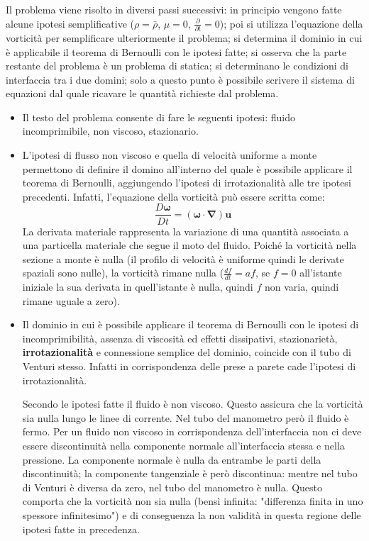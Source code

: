 \parttwo
Il problema viene risolto in diversi passi successivi: in principio vengono fatte alcune ipotesi semplificative ($\rho = \bar{\rho}$, $\mu=0$, $\frac{\partial}{\partial t}=0$); poi si utilizza l'equazione della vorticità per semplificare ulteriormente il problema; si determina il dominio in cui è applicabile il teorema di Bernoulli con le ipotesi fatte; si osserva che la parte restante del problema è un problema di statica; si determinano le condizioni di interfaccia tra i due domini; solo a questo punto è possibile scrivere il sistema di equazioni dal quale ricavare le quantità richieste dal problema.

\begin{itemize}

\item 
Il testo del problema consente di fare le seguenti ipotesi: fluido incomprimibile, non viscoso, stazionario. 

\item
L'ipotesi di flusso non viscoso e quella di velocità uniforme a monte permettono di definire il domino all'interno del quale è possibile applicare il teorema di Bernoulli, aggiungendo l'ipotesi di irrotazionalità alle tre ipotesi precedenti. Infatti, l'equazione della vorticità può essere scritta come:
\begin{equation}
  \frac{D \bm{\omega}}{Dt} = (\bm{\omega} \cdot \bm{\nabla}) \bm{u}
\end{equation}
La derivata materiale rappresenta la variazione di una quantità associata a una particella materiale che segue il moto del fluido. Poiché la vorticità nella sezione a monte è nulla (il profilo di velocità è uniforme quindi le derivate spaziali sono nulle), la vorticità rimane nulla ($\frac{d f}{d t} = a f$, se $f=0$ all'istante iniziale la sua derivata in quell'istante è nulla, quindi $f$ non varia, quindi rimane uguale a zero).

\item
Il dominio in cui è possibile applicare il teorema di Bernoulli con le ipotesi di incomprimibilità, assenza di viscosità ed effetti dissipativi, stazionarietà, \textbf{irrotazionalità} e connessione semplice del dominio, coincide con il tubo di Venturi stesso. Infatti in corrispondenza delle prese a parete cade l'ipotesi di irrotazionalità.

Secondo le ipotesi fatte il fluido è non viscoso. Questo assicura che la vorticità sia nulla lungo le linee di corrente. Nel tubo del manometro però il fluido è fermo. Per un fluido non viscoso in corrispondenza dell'interfaccia non ci deve essere discontinuità nella componente normale all'interfaccia stessa e nella pressione. La componente normale è nulla da entrambe le parti della discontinuità; la componente tangenziale è però discontinua: mentre nel tubo di Venturi è diversa da zero, nel tubo del manometro è nulla. Questo comporta che la vorticità non sia nulla (bensì infinita: "differenza finita in uno spessore infinitesimo") e di conseguenza la non validità in questa regione delle ipotesi fatte in precedenza. 


\end{itemize}

